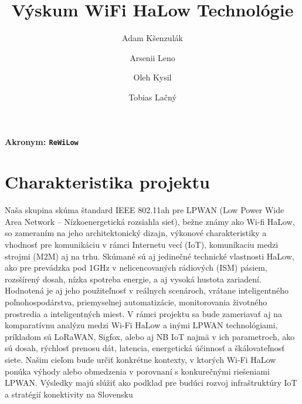 \documentclass[11pt]{article}
\title{ \bf Výskum WiFi HaLow Technológie}
\author{Adam Kšenzulák\and Arsenii Leno\and Oleh Kysil\and Tobias Lačný}
\date{}
\begin{document}
\maketitle
\paragraph {\bf Akronym: \tt ReWiLow}
\section*{\bf Charakteristika projektu}

Naša skupina skúma štandard IEEE 802.11ah pre LPWAN (Low Power Wide Area Network – Nízkoenergetická rozsiahla sieť), bežne známy ako Wi-fi HaLow, so zameraním  na jeho architektonický dizajn, výkonové charakteristiky a vhodnosť pre komunikáciu v rámci Internetu vecí (IoT), komuníkaciu medzi strojmi (M2M) aj na trhu. Skúmané sú aj jedinečné technické vlastnosti HaLow, ako pre prevádzka pod 1GHz v nelicencovaných rádiových (ISM) pásiem, rozsšírený dosah, nízka spotreba energie, a aj vysoká hustota zariadení. Hodnotená je aj jeho použiteľnosť v reálnych scenároch, vrátane inteligentného poľnohospodárstva, priemyselnej automatizácie, monitorovania životného prostredia a inteligentných miest.
V rámci projektu sa bude zameriavať aj na komparatívnu analýzu medzi Wi-Fi HaLow a inými LPWAN technológiami, príkladom sú LoRaWAN, Sigfox, alebo aj NB IoT najmä v ich parametroch, ako sú dosah, rýchlosť prenosu dát, latencia, energetická účinnosť a škálovateľnosť siete. Našim cieľom bude určiť konkrétne kontexty, v ktorých Wi-Fi HaLow ponúka výhody alebo obmedzenia v porovnaní s konkurečnými riešeniami LPWAN. Výsledky majú slúžiť ako podklad pre budúci rozvoj infraštruktúry IoT a stratégií konektivity na Slovensku
\end{document}

